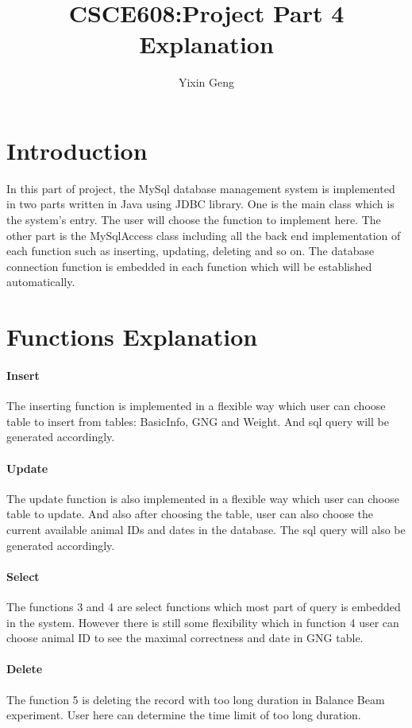 \documentclass[11pt]{article}
\title{CSCE608:Project Part 4 Explanation}
\author{Yixin Geng}
\date{}
\begin{document}
	\maketitle
	\section{Introduction}
		In this part of project, the MySql database management system is implemented in two parts written in Java using JDBC library. One is the main class which is the system's entry. The user will choose the function to implement here. The other part is the MySqlAccess class including all the back end implementation of each function such as inserting, updating, deleting and so on. The database connection function is embedded in each function which will be established automatically.\\
		
	\section{Functions Explanation}
		\paragraph{Insert} The inserting function is implemented in a flexible way which user can choose table to insert from tables: BasicInfo, GNG and Weight. And sql query will be generated accordingly.
		
		\paragraph{Update} The update function is also implemented in a flexible way which user can choose table to update. And also after choosing the table, user can also choose the current available animal IDs and dates in the database. The sql query will also be generated accordingly.
		
		\paragraph{Select} The functions 3 and 4 are select functions which most part of query is embedded in the system. However there is still some flexibility which in function 4 user can choose animal ID to see the maximal correctness and date in GNG table.
		\paragraph{Delete} The function 5 is deleting the record with too long duration in Balance Beam experiment. User here can determine the time limit of too long duration. 
\end{document}

